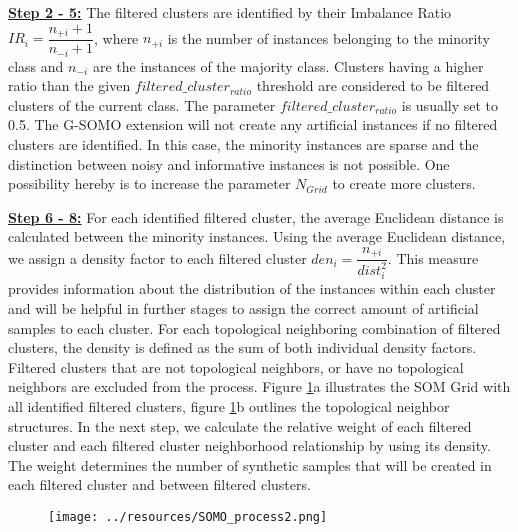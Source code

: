 \documentclass[parskip=full]{scrartcl}
\begin{document}
\textbf{\underline{Step 2 - 5:}} The filtered clusters are identified by their Imbalance Ratio $IR_{i} = \dfrac{n_{+i} +1}{n_{-i} +1}$, where $n_{+i}$ is the number of instances belonging to the minority class and $n_{-i}$ are the instances of the majority class. Clusters having a higher ratio than the given $filtered\_cluster_{ratio}$ threshold are considered to be filtered clusters of the current class. The parameter $filtered\_cluster_{ratio}$ is usually set to 0.5. The G-SOMO extension will not create any artificial instances if no filtered clusters are identified. In this case, the minority instances are sparse and the distinction between noisy and informative instances is not possible. One possibility hereby is to increase the parameter $N_{Grid}$ to create more clusters. 

\textbf{\underline{Step 6 - 8:}} For each identified filtered cluster, the average Euclidean distance is calculated between the minority instances. Using the average Euclidean distance, we assign a density factor to each filtered cluster $den_{i} = \dfrac{n_{+i}}{dist_{i}^2}$. This measure provides information about the distribution of the instances within each cluster and will be helpful in further stages to assign the correct amount of artificial samples to each cluster. For each topological neighboring combination of filtered clusters, the density is defined as the sum of both individual density factors. Filtered clusters that are not topological neighbors, or have no topological neighbors are excluded from the process. Figure \ref{fig:Somo_Overview}a illustrates the SOM Grid with all identified filtered clusters, figure \ref{fig:Somo_Overview}b outlines the topological neighbor structures. In the next step, we calculate the relative weight of each filtered cluster and each filtered cluster neighborhood relationship by using its density. The weight determines the number of synthetic samples that will be created in each filtered cluster and between filtered clusters. 


\begin{figure}[H]
	\centering
	\texttt{[image: ../resources/SOMO\_process2.png]}
	\label{fig:Somo_Overview}
\end{figure}
\end{document}
